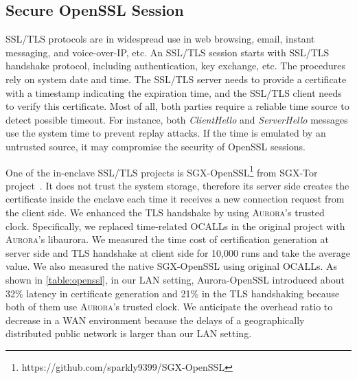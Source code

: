 \documentclass[journal,twocolumn,letterpaper,10pt]{IEEEtran}
\begin{document}
\subsection{Secure OpenSSL Session}\label{openssl}

SSL/TLS protocols are in widespread use in web browsing, email, instant messaging, and voice-over-IP, etc. 
An SSL/TLS session starts with SSL/TLS handshake protocol, including authentication, key exchange, etc. The procedures rely on system date and time. The SSL/TLS server needs to provide a certificate with a timestamp indicating the expiration time, and the SSL/TLS client needs to verify this certificate. Most of all, both parties require a reliable time source to detect possible timeout. For instance, both \emph{ClientHello} and \emph{ServerHello} messages use the system time to prevent replay attacks. If the time is emulated by an untrusted source, it may compromise the security of OpenSSL sessions.

One of the in-enclave SSL/TLS projects is SGX-OpenSSL\footnote{https://github.com/sparkly9399/SGX-OpenSSL} from SGX-Tor project~\cite{DBLP:conf/nsdi/KimHHKH17}. It does not trust the system storage, therefore its server side creates the certificate inside the enclave each time it receives a new connection request from the client side. We enhanced the TLS handshake by using \textsc{Aurora}'s trusted clock. Specifically, we replaced time-related OCALLs in the original project with \textsc{Aurora}'s libaurora. %
We measured the time cost of certification generation at server side and TLS handshake at client side for 10,000 runs and take the average value. We also measured the native SGX-OpenSSL using original OCALLs. As shown in \autoref{table:openssl}, in our LAN setting, Aurora-OpenSSL introduced about 32\% latency in certificate generation and 21\% in the TLS handshaking because both of them use \textsc{Aurora}'s trusted clock. We anticipate the overhead ratio to decrease in a WAN environment because the delays of a geographically distributed public network is larger than our LAN setting.
\end{document}
